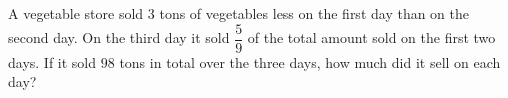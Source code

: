 A vegetable store sold $3$ tons of vegetables less on the first day than on the second day. On the third day it sold $\dfrac{5}{9}$ of the total amount sold on the first two days. If it sold $98$ tons in total over the three days, how much did it sell on each day?
